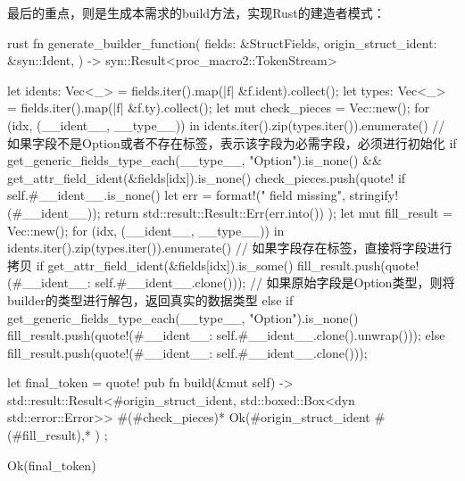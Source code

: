 最后的重点，则是生成本需求的build方法，实现Rust的建造者模式：
\begin{code-block}{rust}
fn generate_builder_function(
    fields: &StructFields,
    origin_struct_ident: &syn::Ident,
) -> syn::Result<proc_macro2::TokenStream> {
    let idents: Vec<_> = fields.iter().map(|f| &f.ident).collect();
    let types: Vec<_> = fields.iter().map(|f| &f.ty).collect();
    let mut check_pieces = Vec::new();
    for (idx, (__ident__, __type__)) in idents.iter().zip(types.iter()).enumerate() {
        // 如果字段不是Option或者不存在标签，表示该字段为必需字段，必须进行初始化
        if get_generic_fields_type_each(__type__, "Option").is_none()
            && get_attr_field_ident(&fields[idx]).is_none()
        {
            check_pieces.push(quote! {
                if self.#__ident__.is_none() {
                    let err = format!("{} field missing", stringify!(#__ident__));
                    return std::result::Result::Err(err.into())
                }
            });
        }
    }
    let mut fill_result = Vec::new();
    for (idx, (__ident__, __type__)) in idents.iter().zip(types.iter()).enumerate() {
        // 如果字段存在标签，直接将字段进行拷贝
        if get_attr_field_ident(&fields[idx]).is_some() {
            fill_result.push(quote!(#__ident__: self.#__ident__.clone()));
        // 如果原始字段是Option类型，则将builder的类型进行解包，返回真实的数据类型
        } else if get_generic_fields_type_each(__type__, "Option").is_none() {
            fill_result.push(quote!(#__ident__: self.#__ident__.clone().unwrap()));
        } else {
            fill_result.push(quote!(#__ident__: self.#__ident__.clone()));
        }
    }

    let final_token = quote! {
        pub fn build(&mut self) -> std::result::Result<#origin_struct_ident, std::boxed::Box<dyn std::error::Error>>{
            #(#check_pieces)*
            Ok(#origin_struct_ident {
                #(#fill_result),*
            })
        }
    };

    Ok(final_token)
}
\end{code-block}

